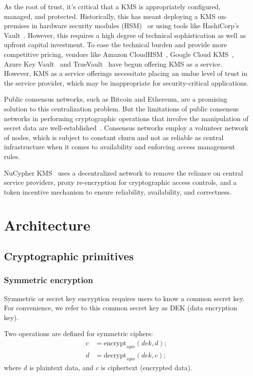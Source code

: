 \documentclass[longbibliography]{revtex4-1}
\newcommand{\kms}{NuCypher KMS}
\begin{document}
As the root of trust, it's critical that a KMS is appropriately configured, managed, and protected.
Historically, this has meant deploying a KMS on-premises in hardware security modules (HSM)~\cite{wiki:hsm} or using tools like
HashiCorp's Vault~\cite{web:hashicorp-vault}.
However, this requires a high degree of technical sophistication as well as upfront capital investment.
To ease the technical burden and provide more competitive pricing, vendors like Amazon CloudHSM~\cite{web:aws-cloudhsm},
Google Cloud KMS~\cite{web:google-cloud-kms}, Azure Key Vault~\cite{web:azure-key-vault} and TrueVault~\cite{web:truevault}
have begun offering KMS as a service.
However, KMS as a service offerings necessitate placing an undue level of trust in the service provider, which may
be inappropriate for security-critical applications.

Public consensus networks, such as Bitcoin and Ethereum, are a promising solution to this centralization problem.
But the limitations of public consensus networks in performing cryptographic operations that involve the manipulation of secret
data are well-established~\cite{cryptoeprint:2017:201}. Consensus networks employ a volunteer network of nodes,
which is subject to constant churn and not as reliable as central infrastructure when it comes to availability and
enforcing access management rules.

\kms~ uses a decentralized network to remove the reliance on central service providers, proxy re-encryption for cryptographic
access controls, and a token incentive mechanism to ensure reliability, availability, and correctness.

\section{Architecture}

\subsection{Cryptographic primitives}

\subsubsection{Symmetric encryption}

Symmetric or secret key encryption requires users to know a common secret key.
For convenience, we refer to this common secret key as DEK (data encryption key).

Two operations are defined for symmetric ciphers:
\begin{align}
    c &= \text{encrypt}_{sym}(dek, d);\\
    d &= \text{decrypt}_{sym}(dek, c);
\end{align}
where $d$ is plaintext data, and $c$ is ciphertext (encrypted data).
\end{document}
